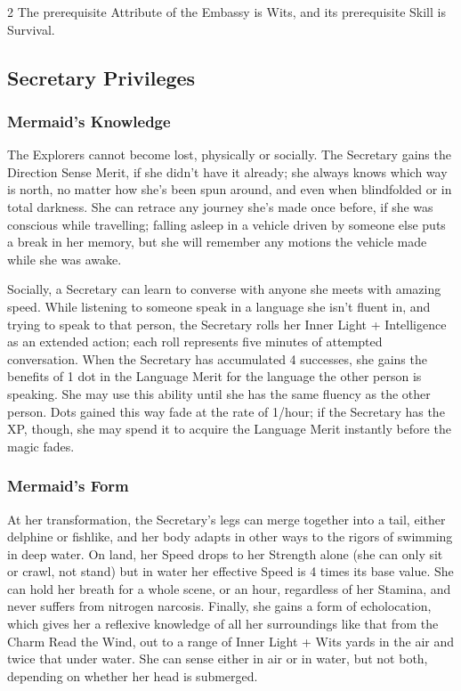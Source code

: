 \begin{multicols}{2}
The prerequisite Attribute of the Embassy is Wits, and its prerequisite Skill is Survival. 

\subsection*{Secretary Privileges}

\subsubsection*{Mermaid's Knowledge}
The Explorers cannot become lost, physically or socially. The Secretary gains the Direction Sense Merit, if she didn't have it already; she always knows which way is north, no matter how she's been spun around, and even when blindfolded or in total darkness. She can retrace any journey she's made once before, if she was conscious while travelling; falling asleep in a vehicle driven by someone else puts a break in her memory, but she will remember any motions the vehicle made while she was awake.

Socially, a Secretary can learn to converse with anyone she meets with amazing speed. While listening to someone speak in a language she isn't fluent in, and trying to speak to that person, the Secretary rolls her Inner Light + Intelligence as an extended action; each roll represents five minutes of attempted conversation. When the Secretary has accumulated 4 successes, she gains the benefits of 1 dot in the Language Merit for the language the other person is speaking. She may use this ability until she has the same fluency as the other person. Dots gained this way fade at the rate of 1/hour; if the Secretary has the XP, though, she may spend it to acquire the Language Merit instantly before the magic fades. 
\subsubsection*{Mermaid's Form}
At her transformation, the Secretary's legs can merge together into a tail, either delphine or fishlike, and her body adapts in other ways to the rigors of swimming in deep water. On land, her Speed drops to her Strength alone (she can only sit or crawl, not stand) but in water her effective Speed is 4 times its base value. She can hold her breath for a whole scene, or an hour, regardless of her Stamina, and never suffers from nitrogen narcosis. Finally, she gains a form of echolocation, which gives her a reflexive knowledge of all her surroundings like that from the Charm Read the Wind, out to a range of Inner Light + Wits yards in the air and twice that under water. She can sense either in air or in water, but not both, depending on whether her head is submerged.


\end{multicols}
